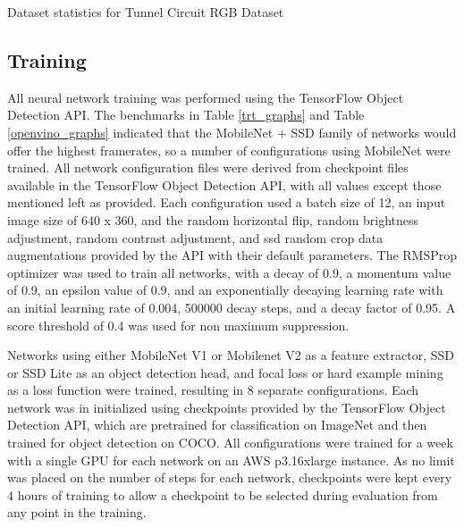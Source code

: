 
\begin{table}
	\centering
	\begin{adjustbox}{max width=.9\textwidth}
	\end{adjustbox}
	\caption{Dataset statistics for Tunnel Circuit RGB Dataset}
	\label{rgb_statistics}
\end{table}
 
\subsection{Training}

All neural network training was performed using the TensorFlow Object Detection API. The benchmarks in Table \ref{trt_graphs} and Table \ref{openvino_graphs} indicated that the MobileNet + SSD family of networks would offer the highest framerates, so a number of configurations using MobileNet were trained. All network configuration files were derived from checkpoint files available in the TensorFlow Object Detection API, with all values except those mentioned left as provided. Each configuration used a batch size of 12, an input image size of 640 x 360, and the random horizontal flip, random brightness adjustment, random contrast adjustment, and ssd random crop data augmentations provided by the API with their default parameters. The RMSProp optimizer was used to train all networks, with a decay of 0.9, a momentum value of 0.9, an epsilon value of 0.9, and an exponentially decaying learning rate with an initial learning rate of 0.004, 500000 decay steps, and a decay factor of 0.95. A score threshold of 0.4 was used for non maximum suppression.

Networks using either MobileNet V1 or Mobilenet V2 as a feature extractor, SSD or SSD Lite as an object detection head, and focal loss or hard example mining as a loss function were trained, resulting in 8 separate configurations. Each network was in initialized using checkpoints provided by the TensorFlow Object Detection API, which are pretrained for classification on ImageNet and then trained for object detection on COCO. All configurations were trained for a week with a single GPU for each network on an AWS p3.16xlarge instance. As no limit was placed on the number of steps for each network, checkpoints were kept every 4 hours of training to allow a checkpoint to be selected during evaluation from any point in the training.

